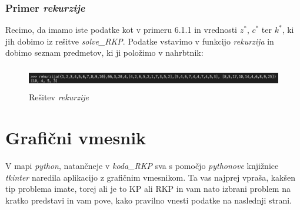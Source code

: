 \documentclass[a4paper,12pt]{article}
\theoremstyle{definition}
\begin{document}
\subsubsection{Primer \textit{rekurzije}}

Recimo, da imamo iste podatke kot v primeru 6.1.1 in vrednosti $z^{*}$, $c^{*}$ ter $k^{*}$, ki jih dobimo 
iz rešitve \textit{solve\_RKP}. Podatke vstavimo v funkcijo \textit{rekurzija} in dobimo seznam predmetov, 
ki ji položimo v nahrbtnik: 

\begin{figure}[h]
    \includegraphics[width=14cm, height = 1cm]{primer_rekurzija.png}
    \caption{Rešitev \textit{rekurzije}}
    \label{fig:koda6}    
\end{figure}

\section{Grafični vmesnik}

V mapi \textit{python}, natančneje v \textit{koda\_RKP} sva s pomočjo \textit{pythonove} knjižnice \textit{tkinter}
naredila aplikacijo z grafičnim vmesnikom. Ta vas najprej vpraša, kakšen tip problema imate, torej ali 
je to KP ali RKP in vam nato izbrani problem na kratko predstavi in vam pove, kako pravilno vnesti podatke 
na naslednji strani.
\end{document}
